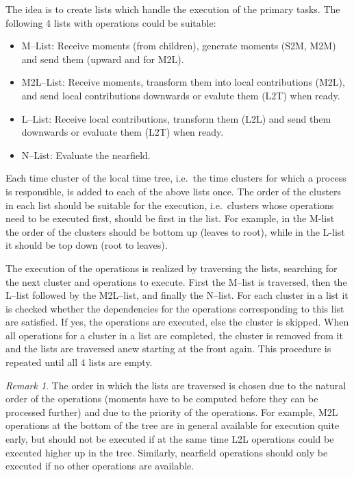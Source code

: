 \documentclass[a4paper,11pt]{article}
\theoremstyle{plain}
\theoremstyle{definition}
\theoremstyle{remark}
\newtheorem{remark}[thm]{Remark}
\begin{document}
The idea is to create lists which handle the execution of the primary tasks. The following 4 lists with operations could be suitable:
\begin{itemize}
  \item M--List: Receive moments (from children), generate moments (S2M, M2M) and send them (upward and for M2L).
  \item M2L--List: Receive moments, transform them into local contributions (M2L), and send local contributions downwards or evalute them (L2T) when ready.
  \item L--List: Receive local contributions, transform them (L2L) and send them downwards or evaluate them (L2T) when ready.
  \item N--List: Evaluate the nearfield.
\end{itemize}
Each time cluster of the local time tree, i.e.~the time clusters for which a process is responsible, is added to each of the above lists once. The order of the clusters in each list should be suitable for the execution, i.e.~clusters whose operations need to be executed first, should be first in the list. For example, in the M-list the order of the clusters should be bottom up (leaves to root), while in the L-list it should be top down (root to leaves). 

The execution of the operations is realized by traversing the lists, searching for the next cluster and operations to execute. First the M--list is traversed, then the L--list followed by the M2L--list, and finally the N--list. For each cluster in a list it is checked whether the dependencies for the operations corresponding to this list are satisfied. If yes, the operations are executed, else the cluster is skipped. When all operations for a cluster in a list are completed, the cluster is removed from it and the lists are traversed anew starting at the front again. This procedure is repeated until all 4 lists are empty.

\begin{remark}
  The order in which the lists are traversed is chosen due to the natural order of the operations (moments have to be computed before they can be processed further) and due to the priority of the operations. For example, M2L operations at the bottom of the tree are in general available for execution quite early, but should not be executed if at the same time L2L operations could be executed higher up in the tree. Similarly, nearfield operations should only be executed if no other operations are available.   
\end{remark}
\end{document}
